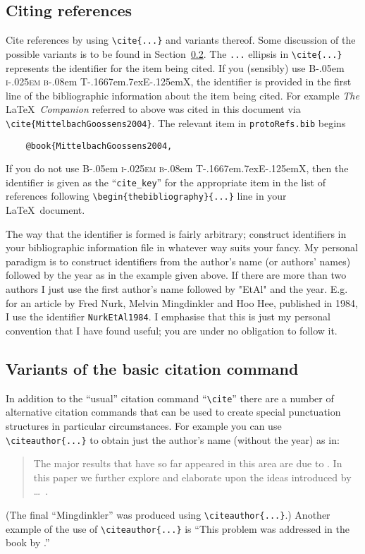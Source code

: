 \documentclass[times, doublespace]{anzsauth}
\newcommand\BibTeX{{\rmfamily B\kern-.05em \textsc{i\kern-.025em b}\kern-.08em
T\kern-.1667em\lower.7ex\hbox{E}\kern-.125emX}}
\begin{document}
\subsection{Citing references}
\label{sec:citRef}
Cite references by using \verb!\cite{...}! and variants
thereof.  Some discussion of the possible variants is to be
found in Section~\ref{sec:citeVar}.  The \verb!...! ellipsis
in \verb!\cite{...}! represents the identifier for the item
being cited.  If you (sensibly) use \BibTeX, the identifier
is provided in the first line of the bibliographic information
about the item being cited.  For example \textit{The} \LaTeX\
\textit{Companion} referred to above was cited in this document
via \verb!\cite{MittelbachGoossens2004}!.  The relevant item in
\texttt{protoRefs.bib} begins
\begin{verbatim}
    @book{MittelbachGoossens2004,
\end{verbatim}
If you do not use \BibTeX, then the identifier
is given as the ``\verb!cite_key!'' for the appropriate item
in the list of references following \verb!\begin{thebibliography}{...}!
line in your \LaTeX\ document.

The way that the identifier is formed is fairly arbitrary; construct
identifiers in your bibliographic information file in whatever way
suits your fancy.  My personal paradigm is to construct identifiers
from the author's name (or authors' names) followed by the year as
in the example given above.  If there are more than two authors I
just use the first author's name followed by "EtAl" and the year.
E.g. for an article by Fred Nurk, Melvin Mingdinkler and Hoo Hee,
published in 1984, I use the identifier \texttt{NurkEtAl1984}.
I emphasise that this is just my personal convention that I have
found useful; you are under no obligation to follow it.

\subsection{Variants of the basic citation command}
\label{sec:citeVar}

In addition to the ``usual'' citation command ``\verb!\cite!''
there are a number of alternative citation commands that can be used
to create special punctuation structures in particular circumstances.
For example you can use \verb!\citeauthor{...}! to obtain just the
author's name (without the year) as in:
\begin{quote}
The major results that have so far appeared in this area are due
to \cite{Mingdinkler1999}.  In this paper we further explore and
elaborate upon the ideas introduced by \citeauthor{Mingdinkler1999}
\ldots~.
\end{quote}
(The final ``Mingdinkler'' was produced using \verb!\citeauthor{...}!.)
Another example of the use of \verb!\citeauthor{...}! is
``This problem was addressed in the book by
\citeauthor{Thecowsoutside1984}.''
\end{document}
